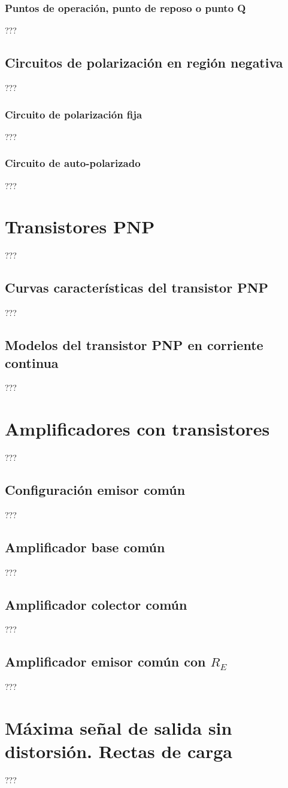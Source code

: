 \subsubsection{Puntos de operación, punto de reposo o punto Q}
???
\subsection{Circuitos de polarización en región negativa}
???
\subsubsection{Circuito de polarización fija}
???
\subsubsection{Circuito de auto-polarizado}
???
\section{Transistores PNP}
???
\subsection{Curvas características del transistor PNP}
???
\subsection{Modelos del transistor PNP en corriente continua}
???
\section{Amplificadores con transistores}
???
\subsection{Configuración emisor común}
???
\subsection{Amplificador base común}
???
\subsection{Amplificador colector común}
???
\subsection{Amplificador emisor común con $R_E$}
???
\section{Máxima señal de salida sin distorsión. Rectas de carga}
???
